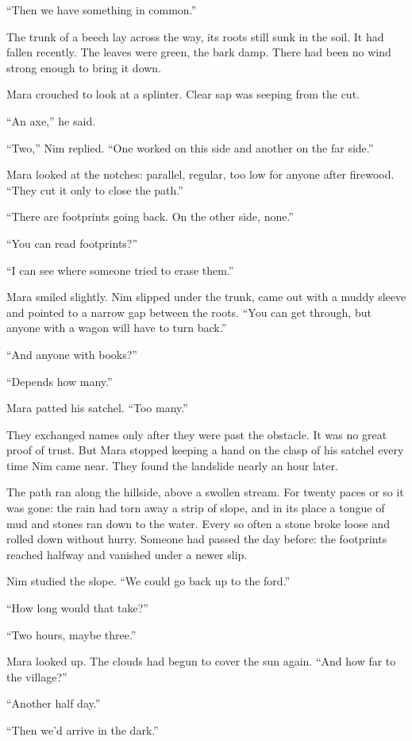 \documentclass[10pt,a4paper]{article}
\begin{document}
“Then we have something in common.”

The trunk of a beech lay across the way, its roots still sunk in the soil. It had fallen recently. The leaves were green, the bark damp. There had been no wind strong enough to bring it down.

Mara crouched to look at a splinter. Clear sap was seeping from the cut.

“An axe,” he said.

“Two,” Nim replied. “One worked on this side and another on the far side.”

Mara looked at the notches: parallel, regular, too low for anyone after firewood. “They cut it only to close the path.”

“There are footprints going back. On the other side, none.”

“You can read footprints?”

“I can see where someone tried to erase them.”

Mara smiled slightly. Nim slipped under the trunk, came out with a muddy sleeve and pointed to a narrow gap between the roots. “You can get through, but anyone with a wagon will have to turn back.”

“And anyone with books?”

“Depends how many.”

Mara patted his satchel. “Too many.”

They exchanged names only after they were past the obstacle. It was no great proof of trust. But Mara stopped keeping a hand on the clasp of his satchel every time Nim came near.
They found the landslide nearly an hour later.

The path ran along the hillside, above a swollen stream. For twenty paces or so it was gone: the rain had torn away a strip of slope, and in its place a tongue of mud and stones ran down to the water. Every so often a stone broke loose and rolled down without hurry. Someone had passed the day before: the footprints reached halfway and vanished under a newer slip.

Nim studied the slope. “We could go back up to the ford.”

“How long would that take?”

“Two hours, maybe three.”

Mara looked up. The clouds had begun to cover the sun again. “And how far to the village?”

“Another half day.”

“Then we'd arrive in the dark.”
\end{document}
